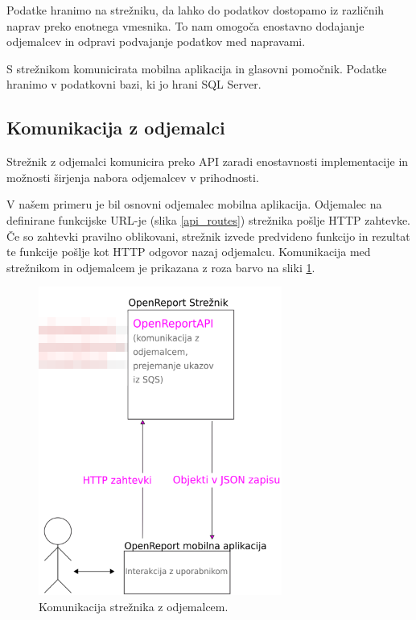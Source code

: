 \documentclass[a4paper, 12pt]{book}
\begin{document}
Podatke hranimo na strežniku, da lahko do podatkov dostopamo iz različnih naprav preko enotnega vmesnika.
To nam omogoča enostavno dodajanje odjemalcev in odpravi podvajanje podatkov med napravami.

S strežnikom komunicirata mobilna aplikacija in glasovni pomočnik.
Podatke hranimo v podatkovni bazi, ki jo hrani SQL Server.



\subsection{Komunikacija z odjemalci}

Strežnik z odjemalci komunicira preko API zaradi enostavnosti implementacije in možnosti širjenja nabora odjemalcev v prihodnosti.

V našem primeru je bil osnovni odjemalec mobilna aplikacija.
Odjemalec na definirane funkcijske URL-je (slika \ref{api_routes}) strežnika pošlje HTTP zahtevke.
Če so zahtevki pravilno oblikovani, strežnik izvede predvideno funkcijo in rezultat te funkcije pošlje kot HTTP odgovor nazaj odjemalcu.
Komunikacija med strežnikom in odjemalcem je prikazana z roza barvo na sliki \ref{plan_server_client}.

\clearpage

\begin{figure}[H]
\begin{center}
\includegraphics[width=8cm]{plan_server_client}
\end{center}
\caption{Komunikacija strežnika z odjemalcem.}
\label{plan_server_client}
\end{figure}
\end{document}
